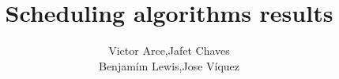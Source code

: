 \documentclass[14pt,aspectratio=169]{beamer}
\author {Victor Arce,Jafet Chaves\\Benjam\'iın Lewis,Jose V\'iquez}
\institute{Tecnol\'ogico de Costa Rica}
\title{Scheduling algorithms results}
\begin{document}
\begin{frame}
    \titlepage
\end{frame}


\end{document}
